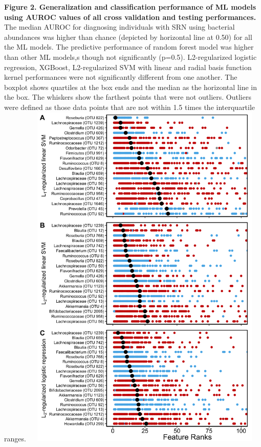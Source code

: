 \documentclass[11pt,]{article}
\begin{document}
\textbf{Figure 2. Generalization and classification performance of ML
models using AUROC values of all cross validation and testing
performances.} The median AUROC for diagnosing individuals with SRN
using bacterial abundances was higher than chance (depicted by
horizontal line at 0.50) for all the ML models. The predictive
performance of random forest model was higher than other ML models,s
though not significantly (p=0.5). L2-regularized logistic regression,
XGBoost, L2-regularized SVM with linear and radial basis function kernel
performances were not significantly different from one another. The
boxplot shows quartiles at the box ends and the median as the horizontal
line in the box. The whiskers show the farthest points that were not
outliers. Outliers were defined as those data points that are not within
1.5 times the interquartile ranges. \newpage
\includegraphics[height=17cm, width=12cm]{Figure_3.png}
\end{document}
